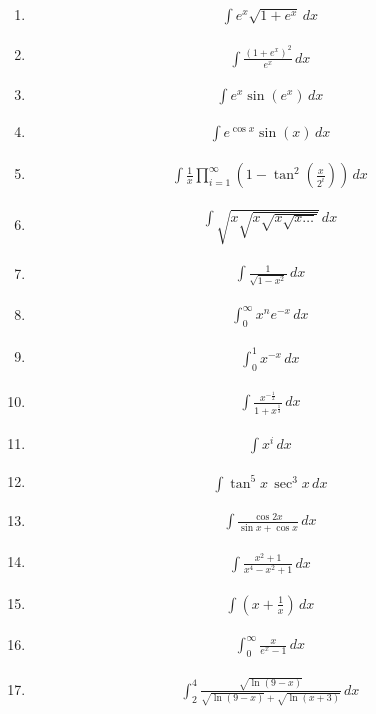 \documentclass[twoside, fleqn,12pt, letterpaper]{article}
\newcommand{\makeitem}[1]{\item \begin{align*} {#1}
  \end{align*}}
\begin{document}
\begin{multicols}{2}
\begin{enumerate}
  \makeitem{\int e^x\sqrt{1+e^x} \, dx}
  
  \makeitem{\int\frac{(1+e^x)^2}{e^x} \, dx}
  
  \makeitem{\int e^x\sin(e^x) \, dx}
  
  \makeitem{\int e^{\cos x}\sin(x) \, dx}
  
  \makeitem{\int\frac{1}{x}\prod_{i=1}^{\infty}\left(1-\tan^2\left(\frac{x}{2^i}\right)\right)\,dx}
  
  \makeitem{\int\sqrt{x\sqrt{x\sqrt{x\sqrt{x\ldots}}}}\,dx}
  
  \makeitem{\int \frac{1}{\sqrt{1-x^2}} \, dx}
  
  \makeitem{\int_{0}^{\infty}x^ne^{-x}\,dx}
  
  \makeitem{\int_{0}^{1}x^{-x}\,dx}
  
  \makeitem{\int\frac{x^{-\frac{1}{2}}}{1+x^{\frac{1}{3}}}\,dx}
  
  \makeitem{\int x^i\, dx}
  
  \makeitem{\int \tan^5 x \, \sec^3 x \, dx}
  
  \makeitem{\int \frac{\cos{2x}}{\sin{x} + \cos{x}} \, dx}
  
  \makeitem{\int \frac{x^2+1}{x^4-x^2+1} \, dx}
  
  \makeitem{\int \left(x+\frac{1}{x}\right) \, dx}
  
  \makeitem{\int_{0}^{\infty}\frac{x}{e^x-1}\, dx}
  
  \makeitem{\int_{2}^{4}\frac{\sqrt{\ln{(9-x)}}}{\sqrt{\ln{(9-x)}}+\sqrt{\ln{(x+3)}}}\, dx}


\end{enumerate}
\end{multicols}



\end{document}
